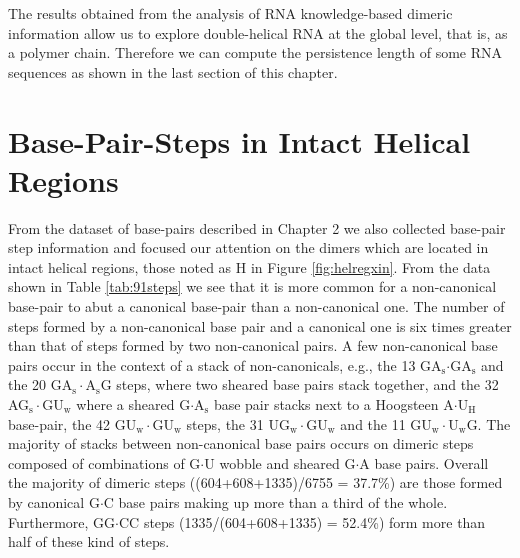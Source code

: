 The results obtained from  the analysis of RNA knowledge-based dimeric
information  allow us  to  explore double-helical  RNA  at the  global
level,  that is,  as a  polymer chain.  Therefore we  can  compute the
persistence length of some RNA  sequences as shown in the last section
of this chapter.

\section{Base-Pair-Steps in Intact Helical Regions} 
From  the  dataset  of  base-pairs  described in  Chapter  2  we  also
collected base-pair step information  and focused our attention on the
dimers which are  located in intact helical regions,  those noted as H
in  Figure   \ref{fig:helregxin}.   From  the  data   shown  in  Table
\ref{tab:91steps} we  see that it  is more common for  a non-canonical
base-pair to abut a canonical base-pair than a non-canonical one.  The
number of  steps formed by a  non-canonical base pair  and a canonical
one  is  six   times  greater  than  that  of   steps  formed  by  two
non-canonical  pairs.  A  few non-canonical  base pairs  occur  in the
context    of   a    stack   of    non-canonicals,   e.g.,    the   13
GA$_{\text{s}}$$\cdot$GA$_{\text{s}}$         and        the        20
GA$_{\text{s}}\cdot$A$_{\text{s}}$G  steps,  where  two  sheared  base
pairs stack  together, and the  32 AG$_{\text{s}}\cdot$GU$_{\text{w}}$
where  a sheared  G$\cdot$A$_{\text{s}}$ base  pair stacks  next  to a
Hoogsteen      A$\cdot$U$_{\text{H}}$      base-pair,      the      42
GU$_{\text{w}}\cdot$GU$_{\text{w}}$        steps,        the        31
UG$_{\text{w}}\cdot$GU$_{\text{w}}$         and         the         11
GU$_{\text{w}}\cdot$U$_{\text{w}}$G.   The majority of  stacks between
non-canonical  base   pairs  occurs  on  dimeric   steps  composed  of
combinations  of G$\cdot$U  wobble and  sheared G$\cdot$A  base pairs.
Overall the  majority of dimeric steps  ((604+608+1335)/6755 = 37.7\%)
are those formed by canonical G$\cdot$C base pairs making up more than
a    third   of   the    whole.    Furthermore,    GG$\cdot$CC   steps
(1335/(604+608+1335) =  52.4\%) form more  than half of these  kind of
steps.

